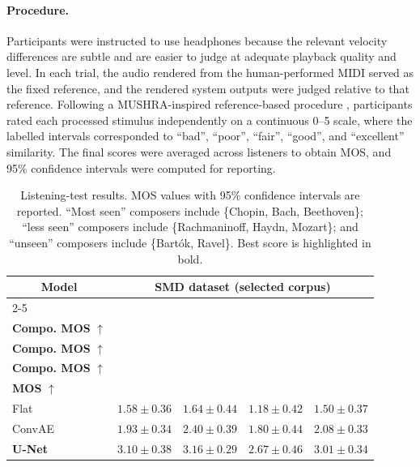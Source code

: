 \paragraph{Procedure.}
Participants were instructed to use headphones because the relevant velocity differences are subtle and are easier to judge at adequate playback quality and level.
In each trial, the audio rendered from the human-performed MIDI served as the fixed reference, and the rendered system outputs were judged relative to that reference.
Following a MUSHRA-inspired reference-based procedure \cite{series2014mursha}, participants rated each processed stimulus independently on a continuous 0--5 scale, where the labelled intervals corresponded to ``bad'', ``poor'', ``fair'', ``good'', and ``excellent'' similarity.
The final scores were averaged across listeners to obtain MOS, and 95\% confidence intervals were computed for reporting.

\begin{table}[h]
\centering
\caption{Listening-test results. MOS values with 95\% confidence intervals are reported. ``Most seen'' composers include \{Chopin, Bach, Beethoven\}; ``less seen'' composers include \{Rachmaninoff, Haydn, Mozart\}; and ``unseen'' composers include \{Bart\'ok, Ravel\}. Best score is highlighted in bold.}
\label{tab:velcomp_mos}
\setlength{\tabcolsep}{7pt}          %
\fontsize{11pt}{13pt}\selectfont     %
\renewcommand{\arraystretch}{1.2}    %
\begin{tabular}{l|cccc}
\toprule
\multicolumn{1}{c|}{\multirow{2}{*}{\textbf{Model}}}
& \multicolumn{4}{c}{\textbf{SMD dataset (selected corpus)}} \\
\cmidrule(l){2-5}
& \makecell{\textbf{Most Seen}\\\textbf{Compo. MOS} \(\uparrow\)}
& \makecell{\textbf{Less Seen}\\\textbf{Compo. MOS} \(\uparrow\)}
& \makecell{\textbf{Unseen}\\\textbf{Compo. MOS} \(\uparrow\)}
& \makecell{\textbf{Overall}\\\textbf{MOS} \(\uparrow\)} \\
\midrule
Flat & $1.58 \pm 0.36$ & $1.64 \pm 0.44$ & $1.18 \pm 0.42$ & $1.50 \pm 0.37$ \\
ConvAE & $1.93 \pm 0.34$ & $2.40 \pm 0.39$ & $1.80 \pm 0.44$ & $2.08 \pm 0.33$ \\
\textbf{U-Net} & $\mathbf{3.10 \pm 0.38}$ & $\mathbf{3.16 \pm 0.29}$ & $\mathbf{2.67 \pm 0.46}$ & $\mathbf{3.01 \pm 0.34}$ \\
\bottomrule
\end{tabular}
\end{table}

